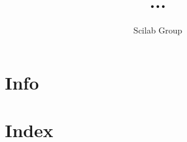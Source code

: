 \documentclass[11pt]{book}
\title{...}
\author{Scilab Group}
\begin{document}
\maketitle

\tableofcontents 

\chapter{Info}

 

\chapter{Index}

\printindex
\end{document}
